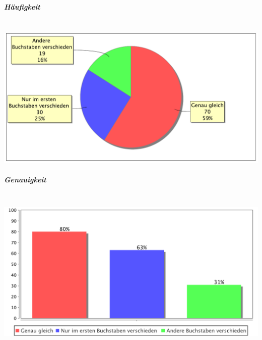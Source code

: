 \subparagraph*{Häufigkeit}~\\
\includegraphics[width=\textwidth]{img/pdf/wortschatz2dbpedia.analyse.CaseClassifier.piechart.pdf}
\subparagraph*{Genauigkeit}~\\
\includegraphics[width=\textwidth]{img/pdf/wortschatz2dbpedia.analyse.CaseClassifier.barchart.pdf}
